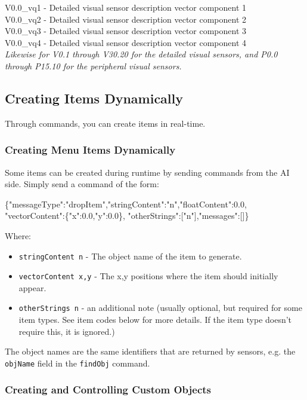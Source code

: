 \noindent V0.0\_vq1 - Detailed visual sensor description vector component 1\\
V0.0\_vq2 - Detailed visual sensor description vector component 2\\
V0.0\_vq3 - Detailed visual sensor description vector component 3\\
V0.0\_vq4 - Detailed visual sensor description vector component 4\\
\textit{Likewise for V0.1 through V30.20 for the detailed visual sensors, and P0.0 through P15.10 for the peripheral visual sensors.}





\subsection{Creating Items Dynamically}

Through commands, you can create items in real-time.

\subsubsection{Creating Menu Items Dynamically}

Some items can be created during runtime by sending commands from the AI side. Simply send a command of the form:
\begin{center}
 \scriptsize{\{"messageType":"dropItem","stringContent":"n","floatContent":0.0, "vectorContent":\{"x":0.0,"y":0.0\}, "otherStrings":["n"],"messages":[]\}} 
 \end{center}
Where:

\begin{itemize}
\item \texttt{stringContent n} - The object name of the item to generate.
\item \texttt{vectorContent x,y} - The x,y positions where the item should initially appear.
\item \texttt{otherStrings n} - an additional note (usually optional, but required for some item types. See item codes below for more details. If the item type doesn't require this, it is ignored.)
\end{itemize}

The object names are the same identifiers that are returned by sensors, e.g. the \texttt{objName} field in the \texttt{findObj} command.

\subsubsection{Creating and Controlling Custom Objects}
\label{sect:custom}


